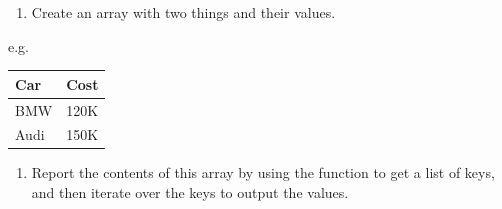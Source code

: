 \begin{aside}
\label{aside:exercise_15}

\begin{enumerate}
\item{} Create an array with two things and their values.
\end{enumerate}

e.g.

\begin{longtable}{|l|l|}
\hline
Car & Cost\\
\hline
BMW & 120K\\
Audi & 150K\\
\hline
\end{longtable}

\begin{enumerate}
\item{} Report the contents of this array by using the  function to
get a list of keys, and then iterate over the keys to output the values.
\end{enumerate}

\end{aside}
\begin{codelisting}
\end{codelisting}





